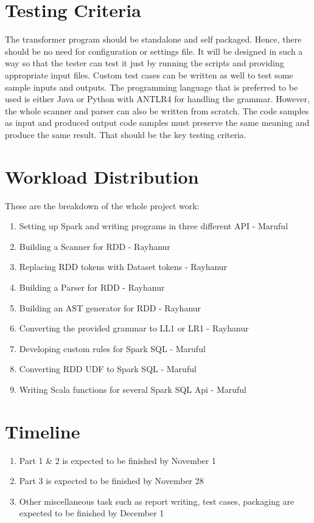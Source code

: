 \documentclass[sigplan, review]{acmart}\settopmatter{printfolios=true,printccs=false,printacmref=false}
\begin{document}
\section{Testing Criteria}
The transformer program should be standalone and self packaged. Hence, there should be no need for configuration or settings file. It will be designed in such a way so that the tester can test it just by running the scripts and providing appropriate input files. Custom test cases can be written as well to test some sample inputs and outputs. The programming language that is preferred to be used is either Java or Python with ANTLR4 for handling the grammar. However, the whole scanner and parser can also be written from scratch. The code samples as input and produced output code samples must preserve the same meaning and produce the same result. That should be the key testing criteria. 

\section{Workload Distribution}
These are the breakdown of the whole project work:
\begin{enumerate}
	\item Setting up Spark and writing programs in three different API - Maruful
	\item Building a Scanner for RDD - Rayhanur
	\item Replacing RDD tokens with Dataset tokens - Rayhanur
	\item Building a Parser for RDD - Rayhanur
	\item Building an AST generator for RDD - Rayhanur
	\item Converting the provided grammar to LL1 or LR1 - Rayhanur
	\item Developing custom rules for Spark SQL - Maruful
	\item Converting RDD UDF to Spark SQL - Maruful
	\item Writing Scala functions for several Spark SQL Api - Maruful
\end{enumerate}

\section{Timeline}
\begin{enumerate}
	\item Part 1 \& 2 is expected to be finished by November 1
	\item Part 3 is expected to be finished by November 28
	\item Other miscellaneous task such as report writing, test cases, packaging are expected to be finished by December 1
\end{enumerate}






%
%
%
%
\end{document}
